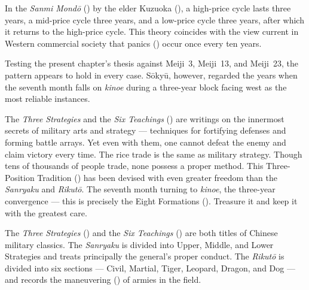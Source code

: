 In the \textit{Sanmi Mond\=o} () by the elder Kuzuoka
(), a high-price cycle lasts three years, a mid-price
cycle three years, and a low-price cycle three years, after which it
returns to the high-price cycle. This theory coincides with the view
current in Western commercial society that panics ()
occur once every ten years.

Testing the present chapter's thesis against Meiji~3, Meiji~13, and
Meiji~23, the pattern appears to hold in every case. S\=oky\=u, however,
regarded the years when the seventh month falls on \textit{kinoe} during a
three-year block facing west as the most reliable instances.


\begin{sokyubox}
{\small\itshape\color{sokyubar} }

\medskip
The \textit{Three Strategies} and the \textit{Six Teachings}
() are writings on
the innermost secrets of military arts and strategy --- techniques for
fortifying defenses
and forming battle arrays. Yet even with them, one cannot defeat the
enemy and claim victory every time. The rice trade is the same as
military strategy. Though tens of thousands of people trade, none
possess a proper method. This Three-Position Tradition
() has been devised with even greater freedom
than the \textit{Sanryaku} and \textit{Rikut\=o}. The seventh month turning
to \textit{kinoe}, the three-year convergence --- this is precisely the
Eight Formations (). Treasure it and keep it with
the greatest care.
\end{sokyubox}

\commentary
The \textit{Three Strategies} () and the \textit{Six Teachings}
() are both titles of Chinese military classics. The
\textit{Sanryaku} is divided into Upper, Middle, and Lower Strategies and
treats principally the general's proper conduct. The \textit{Rikut\=o} is
divided into six sections --- Civil, Martial, Tiger, Leopard, Dragon,
and Dog --- and records the maneuvering () of armies
in the field.

